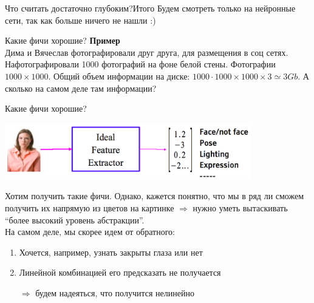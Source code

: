 \documentclass[14pt, fleqn, xcolor={dvipsnames, table}]{beamer}
\begin{document}
\begin{frame}{Что считать достаточно глубоким?}{Итого}\Large
Будем смотреть только на нейронные сети, так как больше ничего не нашли :)
\end{frame}

\begin{frame}{Какие фичи хорошие?}
\small
\textbf{Пример}\\
Дима и Вячеслав фотографировали друг друга, для размещения в соц сетях. Нафотографировали 1000 фотографий на фоне белой стены. Фотографии $1000\times1000$. Общий объем информации на диске: $1000\cdot1000\times1000\times3 \simeq 3Gb$. А сколько на самом деле там информации?
\end{frame}

\begin{frame}{Какие фичи хорошие?}
\begin{center}\includegraphics[width=0.8\textwidth]{faces.png}\end{center}
\small
Хотим получить такие фичи. Однако, кажется понятно, что мы в ряд ли сможем получить их напрямую из цветов на картинке $\Rightarrow$ нужно уметь вытаскивать ``более высокий уровень абстракции''.\\
На самом деле, мы скорее идем от обратного:
\begin{enumerate}
  \item Хочется, например, узнать закрыты глаза или нет
  \item Линейной комбинацией его предсказать не получается
  \item[$\Rightarrow$] будем надеяться, что получится нелинейно
\end{enumerate}
\end{frame}
\end{document}
